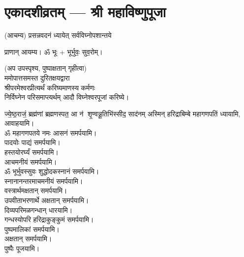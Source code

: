 
\setlength{\parindent}{0pt}
\section[एकादशीव्रतम्]{एकादशीव्रतम् --- श्री महाविष्णुपूजा}


(आचम्य)
{प्रसन्नवदनं ध्यायेत् सर्वविघ्नोपशान्तये}
 
प्राणान्  आयम्य।  ॐ भूः + भूर्भुवः॒ सुव॒रोम्।
 
(अप उपस्पृश्य, पुष्पाक्षतान् गृहीत्वा)\\
ममोपात्तसमस्त दुरितक्षयद्वारा \\
श्रीपरमेश्वरप्रीत्यर्थं करिष्यमाणस्य कर्मणः\\
 निर्विघ्नेन परिसमाप्त्यर्थम् आदौ विघ्नेश्वरपूजां करिष्ये।

{ज्ये॒ष्ठ॒राजं॒ ब्रह्म॑णां ब्रह्मणस्पत॒ आ न॑ शृ॒ण्वन्नू॒तिभि॑स्सीद॒ साद॑नम्}
अस्मिन् हरिद्राबिम्बे महागणपतिं ध्यायामि, आवाहयामि।\\


ॐ महागणपतये नमः  आसनं समर्पयामि।\\
पादयोः पाद्यं समर्पयामि।\\
हस्तयोरर्घ्यं समर्पयामि।\\
आचमनीयं समर्पयामि।\\
ॐ भूर्भुवस्सुवः शुद्धोदकस्नानं समर्पयामि।\\
स्नानानन्तरमाचमनीयं समर्पयामि।\\
वस्त्रार्थमक्षतान् समर्पयामि।\\
उपवीताभरणार्थे अक्षतान् समर्पयामि।\\
दिव्यपरिमळगन्धान् धारयामि।\\
गन्धस्योपरि हरिद्राकुङ्कुमं समर्पयामि।\\
पुष्पमालिकां समर्पयामि।\\
अक्षतान् समर्पयामि।\\
पुष्पैः पूजयामि।

